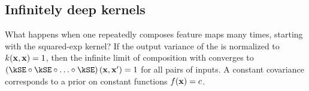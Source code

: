 \subsection{Infinitely deep kernels}
What happens when one repeatedly composes feature maps many times, starting with the squared-exp kernel?
If the output variance of the \kSE{} is normalized to ${k({\bf{x}},{\bf{x}}) = 1}$, then the infinite limit of composition with \kSE{} converges to ${\left(\kSE \circ \kSE \circ \ldots \circ \kSE\right)(\vx,\vx') = 1}$ for all pairs of inputs.
A constant covariance corresponds to a prior on constant functions ${f({\bf{x}}) = c}$.

%


